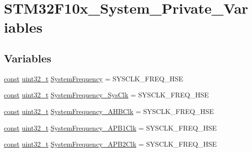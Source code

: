 \hypertarget{group___s_t_m32_f10x___system___private___variables}{\section{S\-T\-M32\-F10x\-\_\-\-System\-\_\-\-Private\-\_\-\-Variables}
\label{group___s_t_m32_f10x___system___private___variables}
}
\subsection*{Variables}
\begin{DoxyCompactItemize}
\item 
\hyperlink{group___n_a_m_e_ga7ae6d0e43244213b34de2c2b9aa30da6}{const} \hyperlink{stdint_8h_a435d1572bf3f880d55459d9805097f62}{uint32\-\_\-t} \hyperlink{group___s_t_m32_f10x___system___private___variables_ga17f99e8fe8a601944f7d27ea3e8c6992}{System\-Frequency} = S\-Y\-S\-C\-L\-K\-\_\-\-F\-R\-E\-Q\-\_\-\-H\-S\-E
\item 
\hyperlink{group___n_a_m_e_ga7ae6d0e43244213b34de2c2b9aa30da6}{const} \hyperlink{stdint_8h_a435d1572bf3f880d55459d9805097f62}{uint32\-\_\-t} \hyperlink{group___s_t_m32_f10x___system___private___variables_ga9ad12bfdb8b11e0d6a10d7777d7a908c}{System\-Frequency\-\_\-\-Sys\-Clk} = S\-Y\-S\-C\-L\-K\-\_\-\-F\-R\-E\-Q\-\_\-\-H\-S\-E
\item 
\hyperlink{group___n_a_m_e_ga7ae6d0e43244213b34de2c2b9aa30da6}{const} \hyperlink{stdint_8h_a435d1572bf3f880d55459d9805097f62}{uint32\-\_\-t} \hyperlink{group___s_t_m32_f10x___system___private___variables_ga01881aecd4a21d0ff8f8e9e0552b2f07}{System\-Frequency\-\_\-\-A\-H\-B\-Clk} = S\-Y\-S\-C\-L\-K\-\_\-\-F\-R\-E\-Q\-\_\-\-H\-S\-E
\item 
\hyperlink{group___n_a_m_e_ga7ae6d0e43244213b34de2c2b9aa30da6}{const} \hyperlink{stdint_8h_a435d1572bf3f880d55459d9805097f62}{uint32\-\_\-t} \hyperlink{group___s_t_m32_f10x___system___private___variables_ga9dc824f030341041d8a3b272bc777038}{System\-Frequency\-\_\-\-A\-P\-B1\-Clk} = S\-Y\-S\-C\-L\-K\-\_\-\-F\-R\-E\-Q\-\_\-\-H\-S\-E
\item 
\hyperlink{group___n_a_m_e_ga7ae6d0e43244213b34de2c2b9aa30da6}{const} \hyperlink{stdint_8h_a435d1572bf3f880d55459d9805097f62}{uint32\-\_\-t} \hyperlink{group___s_t_m32_f10x___system___private___variables_ga82495245e97964eefc64c342459e0315}{System\-Frequency\-\_\-\-A\-P\-B2\-Clk} = S\-Y\-S\-C\-L\-K\-\_\-\-F\-R\-E\-Q\-\_\-\-H\-S\-E
\end{DoxyCompactItemize}


